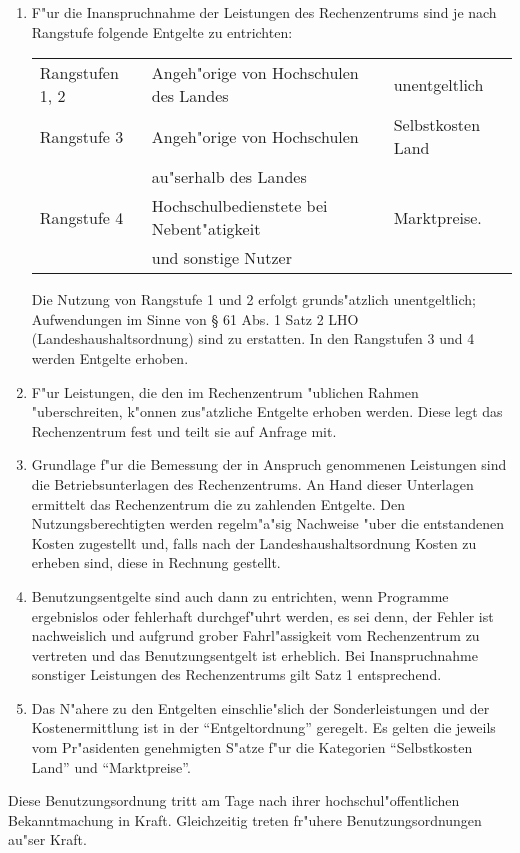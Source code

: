
\begin{enumerate}
  \item F"ur die Inanspruchnahme der Leistungen des Rechenzentrums sind
    je nach Rangstufe folgende Entgelte zu entrichten:

    \begin{tabular}{lll}
      Rangstufen 1, 2&Angeh"orige von Hochschulen des Landes&unentgeltlich\\
      Rangstufe 3&Angeh"orige von Hochschulen&Selbstkosten Land\\
      &au"serhalb des Landes&\\
      Rangstufe 4&Hochschulbedienstete bei Nebent"atigkeit&Marktpreise.\\
      &und sonstige Nutzer&\\
    \end{tabular}

    Die Nutzung von Rangstufe 1 und 2 erfolgt grunds"atzlich unentgeltlich;
    Aufwendungen im Sinne von \S{} 61 Abs. 1 Satz 2 LHO (Landeshaushaltsordnung)
    sind zu erstatten. In den Rangstufen 3 und 4 werden Entgelte erhoben.

  \item F"ur Leistungen, die den im Rechenzentrum "ublichen Rahmen
    "uberschreiten, k"onnen zus"atzliche Entgelte erhoben werden.
    Diese legt das Rechenzentrum fest und teilt sie auf Anfrage mit.

  \item Grundlage f"ur die Bemessung der in Anspruch genommenen Leistungen
    sind die Betriebsunterlagen des Rechenzentrums. An Hand dieser Unterlagen
    ermittelt das Rechenzentrum die zu zahlenden Entgelte. Den
    Nutzungsberechtigten werden regelm"a"sig Nachweise "uber
    die entstandenen Kosten zugestellt und, falls nach der
    Landeshaushaltsordnung Kosten zu erheben sind, diese in Rechnung
    gestellt.

  \item Benutzungsentgelte sind auch dann zu entrichten, wenn Programme
    ergebnislos oder fehlerhaft durchgef"uhrt werden, es sei denn,
    der Fehler ist nachweislich und aufgrund grober Fahrl"assigkeit
    vom Rechenzentrum zu vertreten und das Benutzungsentgelt ist erheblich.
    Bei Inanspruchnahme sonstiger Leistungen des Rechenzentrums gilt
    Satz 1 entsprechend.

  \item Das N"ahere zu den Entgelten einschlie"slich der Sonderleistungen
    und der Kostenermittlung ist in der "`Entgeltordnung"' geregelt. Es gelten
    die jeweils vom Pr"asidenten genehmigten S"atze f"ur die
    Kategorien "`Selbstkosten Land"' und "`Marktpreise"'.
\end{enumerate}


Diese Benutzungsordnung tritt am Tage nach ihrer hochschul"offentlichen
Bekanntmachung in Kraft. Gleichzeitig treten fr"uhere
Benutzungsordnungen au"ser Kraft.
